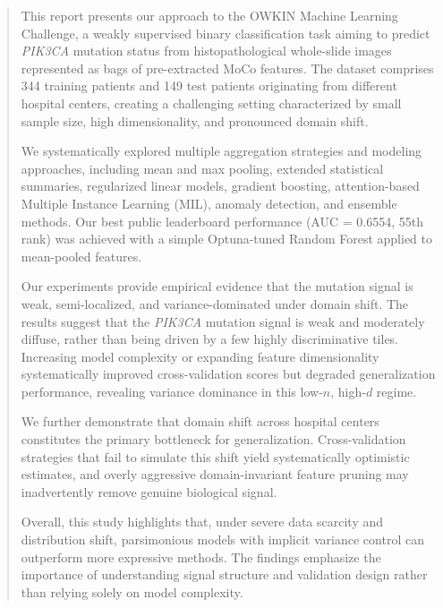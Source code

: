 \documentclass[11pt,a4paper]{article}
\begin{document}
\vspace*{\fill}
\begin{abstract}
\itshape

\noindent This report presents our approach to the OWKIN Machine Learning Challenge, a weakly supervised binary classification task aiming to predict \textit{PIK3CA} mutation status from histopathological whole-slide images represented as bags of pre-extracted MoCo features. 
The dataset comprises 344 training patients and 149 test patients originating from different hospital centers, creating a challenging setting characterized by small sample size, high dimensionality, and pronounced domain shift.

We systematically explored multiple aggregation strategies and modeling approaches, including mean and max pooling, extended statistical summaries, regularized linear models, gradient boosting, attention-based Multiple Instance Learning (MIL), anomaly detection, and ensemble methods. 
Our best public leaderboard performance (AUC = 0.6554, 55th rank) was achieved with a simple Optuna-tuned Random Forest applied to mean-pooled features.

Our experiments provide empirical evidence that the mutation signal is weak, semi-localized, and variance-dominated under domain shift.
The results suggest that the \textit{PIK3CA} mutation signal is weak and moderately diffuse, rather than being driven by a few highly discriminative tiles. 
Increasing model complexity or expanding feature dimensionality systematically improved cross-validation scores but degraded generalization performance, revealing variance dominance in this low-$n$, high-$d$ regime.

We further demonstrate that domain shift across hospital centers constitutes the primary bottleneck for generalization. 
Cross-validation strategies that fail to simulate this shift yield systematically optimistic estimates, and overly aggressive domain-invariant feature pruning may inadvertently remove genuine biological signal.

Overall, this study highlights that, under severe data scarcity and distribution shift, parsimonious models with implicit variance control can outperform more expressive methods. 
The findings emphasize the importance of understanding signal structure and validation design rather than relying solely on model complexity.

\end{abstract}
\vspace*{\fill}
\end{document}
